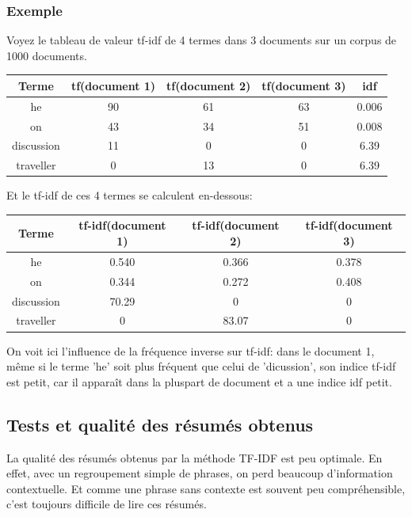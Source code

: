 \documentclass[a4paper, 12pt]{article}
\begin{document}
\subsubsection{Exemple}
Voyez le tableau de valeur tf-idf de 4 termes dans 3 documents sur un corpus de 1000 documents.
\begin{center}
	\begin{tabular}{|c|c|c|c|c|}
	 \hline
	 	Terme & tf(document 1) & tf(document 2) & tf(document 3) & idf \\
	 \hline
	 	he & 90 & 61 & 63 & 0.006 \\
	 \hline
	 	on & 43 & 34 & 51 & 0.008 \\
	 \hline
	 	discussion & 11 & 0 & 0 & 6.39 \\
	 \hline
	 	traveller & 0 & 13 & 0 & 6.39 \\
	 \hline
	\end{tabular}
\end{center}

Et le tf-idf de ces 4 termes se calculent en-dessous:

\begin{center}
	\begin{tabular}{|c|c|c|c|}
	 \hline
	 	Terme & tf-idf(document 1) & tf-idf(document 2) & tf-idf(document 3) \\
	 \hline
	 	he & 0.540 & 0.366 & 0.378 \\
	 \hline
	 	on & 0.344 & 0.272 & 0.408 \\
	 \hline
	 	discussion & 70.29 & 0 & 0 \\
	 \hline
	 	traveller & 0 & 83.07 & 0 \\
	 \hline
	\end{tabular}
\end{center}

On voit ici l'influence de la fréquence inverse sur tf-idf: dans le document 1, même si le terme 'he' soit plus fréquent que celui de 'dicussion', son indice tf-idf est petit, car il apparaît dans la pluspart de document et a une indice idf petit.

\subsection{Tests et qualité des résumés obtenus}

La qualité des résumés obtenus par la méthode TF-IDF est peu optimale. En effet, avec un regroupement simple de phrases, on perd beaucoup d'information contextuelle. Et comme une phrase sans contexte est souvent peu compréhensible, c'est toujours difficile de lire ces résumés.
\end{document}
